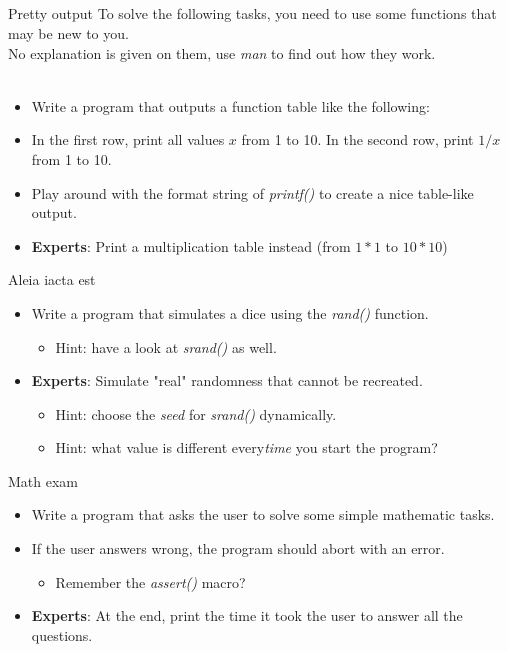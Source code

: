 \subsection{}
\begin{frame}{Pretty output}
	To solve the following tasks, you need to use some functions that may be new to you. \\
	No explanation is given on them, use \textit{man} to find out how they work. \\ \ \\
	\begin{itemize}
		\item Write a program that outputs a function table like the following:
		\item In the first row, print all values $x$ from 1 to 10. In the second row, print $1/x$ from 1 to 10.
		\item Play around with the format string of \textit{printf()} to create a nice table-like output.
		\item \textbf{Experts}: Print a multiplication table instead (from $1*1$ to $10*10$)
	\end{itemize}
\end{frame}
\begin{frame}{Aleia iacta est}
	\begin{itemize}
		\item Write a program that simulates a dice using the \textit{rand()} function.
		\begin{itemize}
			\item<2-> Hint: have a look at \textit{srand()} as well.
		\end{itemize}
		\item \textbf{Experts}: Simulate "real" randomness that cannot be recreated.
		\begin{itemize}
			\item<3-> Hint: choose the \textit{seed} for \textit{srand()} dynamically.
			\item<4-> Hint: what value is different every\textit{time} you start the program?
		\end{itemize}
	\end{itemize}
\end{frame}
\begin{frame}{Math exam}
	\begin{itemize}
		\item Write a program that asks the user to solve some simple mathematic tasks.
		\item If the user answers wrong, the program should abort with an error.
		\begin{itemize}
			\item<2-> Remember the \textit{assert()} macro?
		\end{itemize}
		\item \textbf{Experts}: At the end, print the time it took the user to answer all the questions.
	\end{itemize}
\end{frame}

